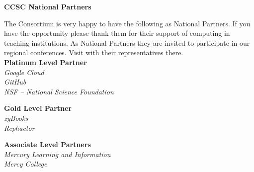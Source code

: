 \documentclass{article}
\begin{document}
\begingroup
  \centering
  \textbf{\large CCSC National Partners\\}
\endgroup

\vspace{10pt}

The Consortium is very happy to have the following as National Partners. If you
have the opportunity please thank them for their support of computing in
teaching institutions. As National Partners they are invited to participate in
our regional conferences. Visit with their representatives there.\\

\begingroup
  \centering
  \textbf{\large Platinum Level Partner}\\
  \textsl{\large Google Cloud}\\
  \textsl{\large GitHub}\\
  \textsl{\large NSF -- National Science Foundation}\\
\endgroup

\vspace{10pt}

\begingroup
  \centering
  \textbf{\large Gold Level Partner}\\
  \textsl{\large zyBooks}\\
  \textsl{\large Rephactor}\\
\endgroup

\vspace{10pt}

\begingroup
  \centering
  \textbf{Associate Level Partners}\\
  \textsl{Mercury Learning and Information}\\
  \textsl{Mercy College}\\
\endgroup
\end{document}
